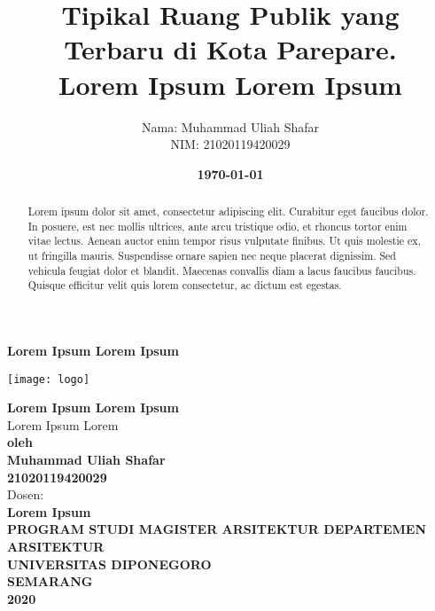 \documentclass[11pt]{simart} %
\title{
\textbf{Tipikal Ruang Publik yang Terbaru di Kota Parepare.} \\
\textbf{{Lorem Ipsum Lorem Ipsum \\}}
} %
\date{\textbf{\today}}
\author{
\begin{tabular}{@{}ll@{}}
	Nama & : Muhammad Uliah Shafar\\
	NIM & : 21020119420029\\
\end{tabular}
}
\begin{document}
\thispagestyle{empty}
	\begin{center}
		\begin{huge}
			\bf{Lorem Ipsum Lorem Ipsum}
		\end{huge}

		\vspace{20pt}
		\texttt{[image: logo]} \\

		\vspace*{35pt}

		\begin{large}
		\textbf{Lorem Ipsum Lorem Ipsum} \\
			Lorem Ipsum Lorem\\

		\vspace{20pt}
		\textbf{oleh\\
			\vspace{20pt}
			Muhammad Uliah Shafar\\21020119420029}\\

			\vspace{20pt}
		Dosen: \\
		\textbf{Lorem Ipsum}\\



		\vspace{60pt}
		\textbf{PROGRAM STUDI MAGISTER ARSITEKTUR DEPARTEMEN ARSITEKTUR\\
			UNIVERSITAS DIPONEGORO\\
			SEMARANG\\
			2020
		}
		\end{large}
	\end{center}
\clearpage

\maketitle %

\begin{abstract}
Lorem ipsum dolor sit amet, consectetur adipiscing elit. Curabitur eget faucibus dolor. In posuere, est nec mollis ultrices, ante arcu tristique odio, et rhoncus tortor enim vitae lectus. Aenean auctor enim tempor risus vulputate finibus. Ut quis molestie ex, ut fringilla mauris. Suspendisse ornare sapien nec neque placerat dignissim. Sed vehicula feugiat dolor et blandit. Maecenas convallis diam a lacus faucibus faucibus. Quisque efficitur velit quis lorem consectetur, ac dictum est egestas.


\end{abstract}
\end{document}
